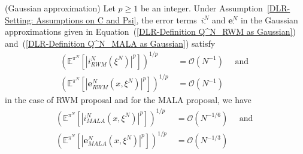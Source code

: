 \begin{lemma}(Gaussian approximation)
  \label{DLR: Lemma Gaussian approximation}
 Let $p \geq 1$ be an integer. Under Assumption~\ref{DLR-Setting: Assumptions on C and Psi}, the error terms~$i^N_{\cdot}$ and $\textbf{e}^N_{\cdot}$ in the Gaussian approximations given in Equation~(\ref{DLR-Definition Q^N_RWM as Gaussian}) and~(\ref{DLR-Definition Q^N_MALA as Gaussian}) satisfy
 \begin{equation}
   \begin{split}
     (\mathbb{E}^{\pi^N}[|i^N_{RWM}( \xi^N) |^p] )^{1/p} & \; = \mathcal{O}(N^{-1}) \quad \text{ and }\\
     (\mathbb{E}^{\pi^N}[|\textbf{e}^N_{RWM}(x, \xi^N)|^p] )^{1/p} & \; = \mathcal{O}(N^{-1})
   \end{split}
 \end{equation}
 in the case of RWM proposal and for the MALA proposal, we have
 \begin{equation}
   \begin{split}
     (\mathbb{E}^{\pi^N}[|i^N_{MALA}(x, \xi^N) |^p] )^{1/p} & \; = \mathcal{O}(N^{-1/6}) \quad \text{ and }\\
     (\mathbb{E}^{\pi^N}[|\textbf{e}^N_{MALA}(x, \xi^N)|^p] )^{1/p} & \; = \mathcal{O}(N^{-1/3})
   \end{split}
 \end{equation}

\end{lemma}

